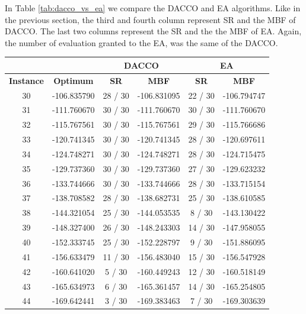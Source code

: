 			In Table \ref{tab:dacco_vs_ea} we compare the DACCO and EA algorithms. Like in the previous section, the third and fourth column represent SR and the MBF of DACCO. The last two columns represent the SR and the the MBF of EA. Again, the number of evaluation granted to the EA, was the same of the DACCO. 
		\begin{table}[!htdp]
				\begin{center}
					\begin{tabular}{| c | c | c | c | c | c |}
						\hline
						\multicolumn{2}{|c|}{} & \multicolumn{2}{c|}{\textbf{DACCO}} & \multicolumn{2}{c|}{\textbf{EA}}\\ \hline
						\textbf{Instance} & \textbf{Optimum} & \textbf{SR} & \textbf{MBF} & \textbf{SR} & \textbf{MBF} \\ \hline
						30 & -106.835790 & 28 / 30 & -106.831095 & 22 / 30 & -106.794747 \\ \hline
						31 & -111.760670 & 30 / 30 & -111.760670 & 30 / 30 & -111.760670 \\ \hline
						32 & -115.767561 & 30 / 30 & -115.767561 & 29 / 30 & -115.766686 \\ \hline
						33 & -120.741345 & 30 / 30 & -120.741345 & 28 / 30 & -120.697611 \\ \hline
						34 & -124.748271 & 30 / 30 & -124.748271 & 28 / 30 & -124.715475 \\ \hline
						35 & -129.737360 & 30 / 30 & -129.737360 & 27 / 30 & -129.623232 \\ \hline
						36 & -133.744666 & 30 / 30 & -133.744666 & 28 / 30 & -133.715154 \\ \hline
						37 & -138.708582 & 28 / 30 & -138.682731 & 25 / 30 & -138.610585 \\ \hline
						38 & -144.321054 & 25 / 30 & -144.053535 & 8 / 30 & -143.130422 \\ \hline
						39 & -148.327400 & 26 / 30 & -148.243303 & 14 / 30 & -147.958055 \\ \hline
						40 & -152.333745 & 25 / 30 & -152.228797 & 9 / 30 & -151.886095 \\ \hline
						41 & -156.633479 & 11 / 30 & -156.483040 & 15 / 30 & -156.547928 \\ \hline
						42 & -160.641020 & 5 / 30 & -160.449243 & 12 / 30 & -160.518149 \\ \hline
						43 & -165.634973 & 6 / 30 & -165.361457 & 14 / 30 & -165.254805 \\ \hline
						44 & -169.642441 & 3 / 30 & -169.383463 & 7 / 30 & -169.303639 \\ \hline

\end{tabular}
\end{center}
\end{table}
